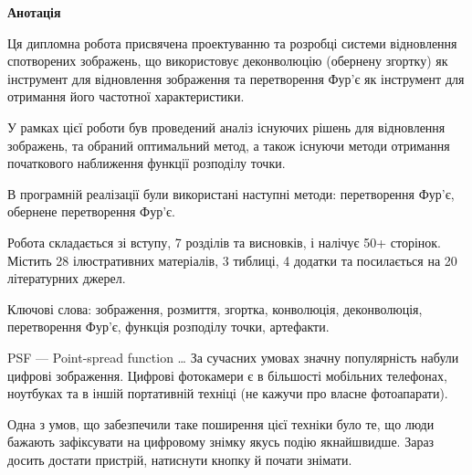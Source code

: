 \documentclass{diploma}
\begin{document}
%
%
%
%
%
\thispagestyle{empty}
\begin{center}
  \bfseries Анотація
\end{center}
Ця дипломна робота присвячена проектуванню та розробці системи відновлення
спотворених зображень, що використовує деконволюцію (обернену згортку) як
інструмент для відновлення зображення та перетворення Фур’є як інструмент для
отримання його частотної характеристики.

У рамках цієї роботи був проведений аналіз існуючих рішень для відновлення
зображень, та обраний оптимальний метод, а також існуючи методи отримання
початкового наближення функції розподілу точки.

В програмній реалізації були використані наступні методи: перетворення Фур’є,
обернене перетворення Фур’є.

Робота складається зі вступу, 7 розділів та висновків, і налічує 50+ сторінок.
Містить 28 ілюстративних матеріалів, 3 тиблиці, 4 додатки та посилається на 20
літературних джерел.

Ключові слова: зображення, розмиття, згортка, конволюція, деконволюція,
перетворення Фур’є, функція розподілу точки, артефакти.
\clearpage

\maketitlepage
\shortings
PSF --- Point-spread function
\ldots
\clearpage
\intro
  За сучасних умовах значну популярність набули цифрові зображення.
  Цифрові фотокамери є в більшості мобільних телефонах, ноутбуках та в іншій
  портативній техніці (не кажучи про власне фотоапарати).

  Одна з умов, що забезпечили таке поширення цієї техніки було те, що люди
  бажають зафіксувати на цифровому знімку якусь подію якнайшвидше.
  Зараз досить достати пристрій, натиснути кнопку й почати знімати.
\end{document}
